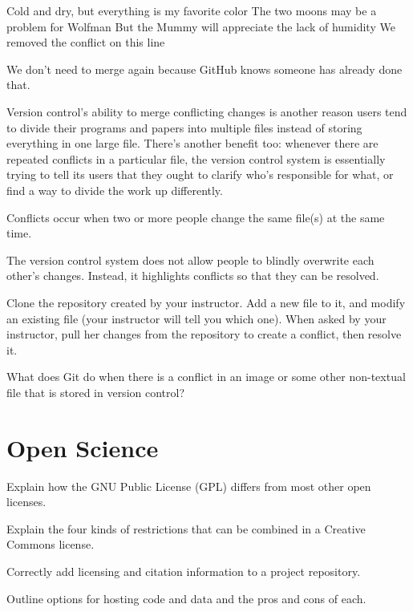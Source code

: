 \documentclass{book}
\begin{document}
\begin{VerbOut}
Cold and dry, but everything is my favorite color
The two moons may be a problem for Wolfman
But the Mummy will appreciate the lack of humidity
We removed the conflict on this line
\end{VerbOut}

We don't need to merge again because GitHub knows someone has already
done that.

Version control's ability to merge conflicting changes is another reason
users tend to divide their programs and papers into multiple files
instead of storing everything in one large file. There's another benefit
too: whenever there are repeated conflicts in a particular file, the
version control system is essentially trying to tell its users that they
ought to clarify who's responsible for what, or find a way to divide the
work up differently.

\begin{keypoints}
\begin{swcitemize}
\item
  Conflicts occur when two or more people change the same file(s) at the
  same time.
\item
  The version control system does not allow people to blindly overwrite
  each other's changes. Instead, it highlights conflicts so that they
  can be resolved.
\end{swcitemize}
\end{keypoints}

\begin{challenge}
  Clone the repository created by your instructor. Add a new file to it,
  and modify an existing file (your instructor will tell you which one).
  When asked by your instructor, pull her changes from the repository to
  create a conflict, then resolve it.
\end{challenge}

\begin{challenge}
  What does Git do when there is a conflict in an image or some other
  non-textual file that is stored in version control?
\end{challenge}

\section{Open Science}

\begin{objectives}
\begin{swcitemize}
\item
  Explain how the GNU Public License (GPL) differs from most other open
  licenses.
\item
  Explain the four kinds of restrictions that can be combined in a
  Creative Commons license.
\item
  Correctly add licensing and citation information to a project
  repository.
\item
  Outline options for hosting code and data and the pros and cons of
  each.
\end{swcitemize}
\end{objectives}
\end{document}
